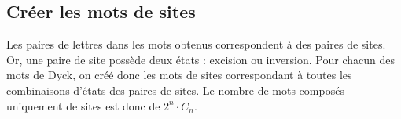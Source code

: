\subsection{Créer les mots de sites}
\label{subsec:logic_to_mot/procede/sites}
\par
Les paires de lettres dans les mots obtenus correspondent à des paires de sites. Or, une paire de site possède deux états : excision ou inversion. Pour chacun des mots de Dyck, on créé donc les mots de sites correspondant à toutes les combinaisons d'états des paires de sites. Le nombre de mots composés uniquement de sites est donc de $2^n \cdot C_n$.\\

